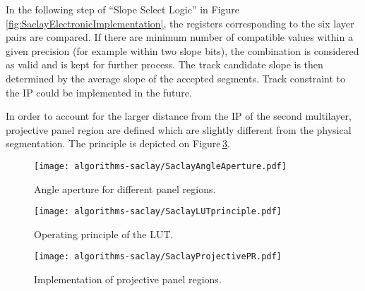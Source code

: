 In the following step of ``Slope Select Logic'' in Figure\,\ref{fig:SaclayElectronicImplementation}, the registers corresponding to the six layer pairs are compared. If there are minimum number of compatible values within a given precision (for example within two slope bits),  the combination is considered as valid and is kept for further process.  The track candidate slope is then determined by the average slope of the accepted segments. Track constraint to the IP could be implemented in the future.

In order to account for the larger distance from the IP of the second multilayer, projective panel region are defined which are slightly different from the physical  segmentation. The principle is depicted on Figure\,\ref{fig:SaclayProjectivePR}.
 \begin{figure}[htb!]
  \begin{center}
  \texttt{[image: algorithms-saclay/SaclayAngleAperture.pdf]}
  \caption{Angle aperture for different panel regions.}
  \label{fig:SaclayAngleAperture}
  \end{center}
  \end{figure}
 \begin{figure}[htb!]
  \begin{center}
  \texttt{[image: algorithms-saclay/SaclayLUTprinciple.pdf]}
  \caption{Operating principle of the LUT.}
  \label{fig:SaclayLUTprinciple}
  \end{center}
  \end{figure}
 \begin{figure}[htb!]
  \begin{center}
  \texttt{[image: algorithms-saclay/SaclayProjectivePR.pdf]}
  \caption{Implementation of projective panel regions.}
  \label{fig:SaclayProjectivePR}
  \end{center}
  \end{figure}
